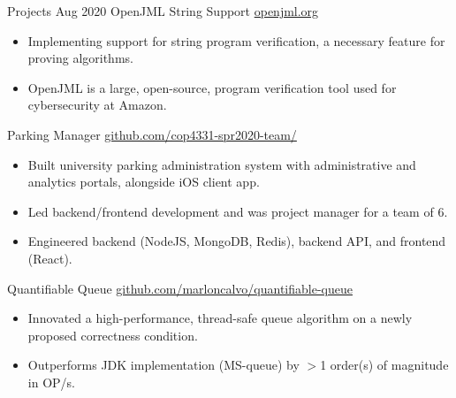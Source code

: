 \documentclass{resume}
\begin{document}
  \begin{fieldlist}{Projects}
    \fieldnotitle
      {Aug 2020}
      {OpenJML String Support}
      {\href{http://www.openjml.org/}{openjml.org}}
      {
        \begin{itemize}
          \item Implementing support for string program verification, a necessary feature for proving algorithms.
          \item OpenJML is a large, open-source, program verification tool used for cybersecurity at Amazon.
        \end{itemize}
      }

      {Parking Manager}
      {\href{https://github.com/cop4331-spr2020-team/}{github.com/cop4331-spr2020-team/}}
      {
        \begin{itemize}
          \setlength\itemsep{0em}
          \item Built university parking administration system with administrative and analytics portals, alongside iOS client app.
          \item Led backend/frontend development and was project manager for a team of 6.
          \item Engineered backend (NodeJS, MongoDB, Redis), backend API, and frontend (React).
        \end{itemize}
      }

      {Quantifiable Queue}
      {\href{https://github.com/marloncalvo/quantifiable-queue}{github.com/marloncalvo/quantifiable-queue}}
      {
        \begin{itemize}
          \item Innovated a high-performance, thread-safe queue algorithm on a newly proposed correctness condition.
          \item Outperforms JDK implementation (MS-queue) by $>$1 order(s) of magnitude in OP/s.
        \end{itemize}
      }



  \end{fieldlist}
\end{document}
